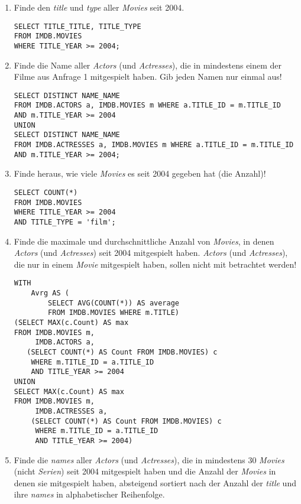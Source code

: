 \documentclass[11pt,a4paper,DIV=9]{scrartcl}
\begin{document}
\begin{enumerate}

\item Finde den \textit{title} und \textit{type} aller \textit{Movies} seit 2004. 
\begin{lstlisting} 
SELECT TITLE_TITLE, TITLE_TYPE
FROM IMDB.MOVIES
WHERE TITLE_YEAR >= 2004;
\end{lstlisting}

\item Finde die Name aller \textit{Actors} (und \textit{Actresses}), die in mindestens einem der Filme aus Anfrage 1 mitgespielt haben. Gib jeden Namen nur einmal aus!
\begin{lstlisting}
SELECT DISTINCT NAME_NAME
FROM IMDB.ACTORS a, IMDB.MOVIES m WHERE a.TITLE_ID = m.TITLE_ID
AND m.TITLE_YEAR >= 2004
UNION
SELECT DISTINCT NAME_NAME
FROM IMDB.ACTRESSES a, IMDB.MOVIES m WHERE a.TITLE_ID = m.TITLE_ID
AND m.TITLE_YEAR >= 2004;
\end{lstlisting}

\item Finde heraus, wie viele \textit{Movies} es seit 2004 gegeben hat (die Anzahl)!
\begin{lstlisting}
SELECT COUNT(*)
FROM IMDB.MOVIES
WHERE TITLE_YEAR >= 2004
AND TITLE_TYPE = 'film';
\end{lstlisting}

\item Finde die maximale und durchschnittliche Anzahl von \textit{Movies}, in denen \textit{Actors} (und \textit{Actresses}) seit 2004 mitgespielt haben. \textit{Actors} (und \textit{Actresses}), die nur in einem \textit{Movie} mitgespielt haben, sollen nicht mit betrachtet werden!
\begin{lstlisting}
WITH
 	Avrg AS (
		SELECT AVG(COUNT(*)) AS average 
		FROM IMDB.MOVIES WHERE m.TITLE)
(SELECT MAX(c.Count) AS max
FROM IMDB.MOVIES m,
  	 IMDB.ACTORS a,
   (SELECT COUNT(*) AS Count FROM IMDB.MOVIES) c
	WHERE m.TITLE_ID = a.TITLE_ID
	AND TITLE_YEAR >= 2004
UNION
SELECT MAX(c.Count) AS max
FROM IMDB.MOVIES m,
	 IMDB.ACTRESSES a,
	(SELECT COUNT(*) AS Count FROM IMDB.MOVIES) c
	 WHERE m.TITLE_ID = a.TITLE_ID
	 AND TITLE_YEAR >= 2004)
\end{lstlisting}

\item Finde die \textit{names} aller \textit{Actors} (und \textit{Actresses}), die in mindestens 30 \textit{Movies} (nicht \textit{Serien}) seit 2004 mitgespielt haben und die Anzahl der \textit{Movies} in denen sie mitgespielt haben, absteigend sortiert nach der Anzahl der \textit{title} und ihre \textit{names} in alphabetischer Reihenfolge.
\begin{lstlisting}
\end{lstlisting}
\end{enumerate}
\end{document}
